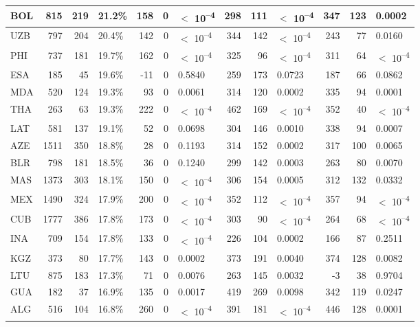 \begin{tabular}{l|r|r|l|r|r|l|r|r|l|r|r|l}
\hline
BOL & 815 & 219 & 21.2\% & 158 & 0 & $<$ 10\textsuperscript{--4} & 298 & 111 & $<$ 10\textsuperscript{--4} & 347 & 123 & 0.0002\\
\hline
UZB & 797 & 204 & 20.4\% & 142 & 0 & $<$ 10\textsuperscript{--4} & 344 & 142 & $<$ 10\textsuperscript{--4} & 243 & 77 & 0.0160\\
\hline
PHI & 737 & 181 & 19.7\% & 162 & 0 & $<$ 10\textsuperscript{--4} & 325 & 96 & $<$ 10\textsuperscript{--4} & 311 & 64 & $<$ 10\textsuperscript{--4}\\
\hline
ESA & 185 & 45 & 19.6\% & -11 & 0 & 0.5840 & 259 & 173 & 0.0723 & 187 & 66 & 0.0862\\
\hline
MDA & 520 & 124 & 19.3\% & 93 & 0 & 0.0061 & 314 & 120 & 0.0002 & 335 & 94 & 0.0001\\
\hline
THA & 263 & 63 & 19.3\% & 222 & 0 & $<$ 10\textsuperscript{--4} & 462 & 169 & $<$ 10\textsuperscript{--4} & 352 & 40 & $<$ 10\textsuperscript{--4}\\
\hline
LAT & 581 & 137 & 19.1\% & 52 & 0 & 0.0698 & 304 & 146 & 0.0010 & 338 & 94 & 0.0007\\
\hline
AZE & 1511 & 350 & 18.8\% & 28 & 0 & 0.1193 & 314 & 152 & 0.0002 & 317 & 100 & 0.0065\\
\hline
BLR & 798 & 181 & 18.5\% & 36 & 0 & 0.1240 & 299 & 142 & 0.0003 & 263 & 80 & 0.0070\\
\hline
MAS & 1373 & 303 & 18.1\% & 150 & 0 & $<$ 10\textsuperscript{--4} & 306 & 154 & 0.0005 & 312 & 132 & 0.0332\\
\hline
MEX & 1490 & 324 & 17.9\% & 200 & 0 & $<$ 10\textsuperscript{--4} & 352 & 112 & $<$ 10\textsuperscript{--4} & 357 & 94 & $<$ 10\textsuperscript{--4}\\
\hline
CUB & 1777 & 386 & 17.8\% & 173 & 0 & $<$ 10\textsuperscript{--4} & 303 & 90 & $<$ 10\textsuperscript{--4} & 264 & 68 & $<$ 10\textsuperscript{--4}\\
\hline
INA & 709 & 154 & 17.8\% & 133 & 0 & $<$ 10\textsuperscript{--4} & 226 & 104 & 0.0002 & 166 & 87 & 0.2511\\
\hline
KGZ & 373 & 80 & 17.7\% & 143 & 0 & 0.0002 & 373 & 191 & 0.0040 & 374 & 128 & 0.0082\\
\hline
LTU & 875 & 183 & 17.3\% & 71 & 0 & 0.0076 & 263 & 145 & 0.0032 & -3 & 38 & 0.9704\\
\hline
GUA & 182 & 37 & 16.9\% & 135 & 0 & 0.0017 & 419 & 269 & 0.0098 & 342 & 119 & 0.0247\\
\hline
ALG & 516 & 104 & 16.8\% & 260 & 0 & $<$ 10\textsuperscript{--4} & 391 & 181 & $<$ 10\textsuperscript{--4} & 446 & 128 & 0.0001\\

\end{tabular}

